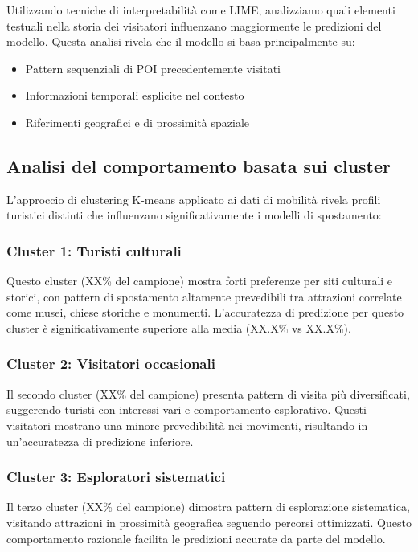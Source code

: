 Utilizzando tecniche di interpretabilità come LIME, analizziamo quali elementi testuali nella storia dei visitatori influenzano maggiormente le predizioni del modello. Questa analisi rivela che il modello si basa principalmente su:
\begin{itemize}
\item Pattern sequenziali di POI precedentemente visitati
\item Informazioni temporali esplicite nel contesto
\item Riferimenti geografici e di prossimità spaziale
\end{itemize}

\subsection{Analisi del comportamento basata sui cluster}

L'approccio di clustering K-means applicato ai dati di mobilità rivela profili turistici distinti che influenzano significativamente i modelli di spostamento:

\subsubsection{Cluster 1: Turisti culturali}

Questo cluster (XX\% del campione) mostra forti preferenze per siti culturali e storici, con pattern di spostamento altamente prevedibili tra attrazioni correlate come musei, chiese storiche e monumenti. L'accuratezza di predizione per questo cluster è significativamente superiore alla media (XX.X\% vs XX.X\%).

\subsubsection{Cluster 2: Visitatori occasionali}

Il secondo cluster (XX\% del campione) presenta pattern di visita più diversificati, suggerendo turisti con interessi vari e comportamento esplorativo. Questi visitatori mostrano una minore prevedibilità nei movimenti, risultando in un'accuratezza di predizione inferiore.

\subsubsection{Cluster 3: Esploratori sistematici}

Il terzo cluster (XX\% del campione) dimostra pattern di esplorazione sistematica, visitando attrazioni in prossimità geografica seguendo percorsi ottimizzati. Questo comportamento razionale facilita le predizioni accurate da parte del modello.

